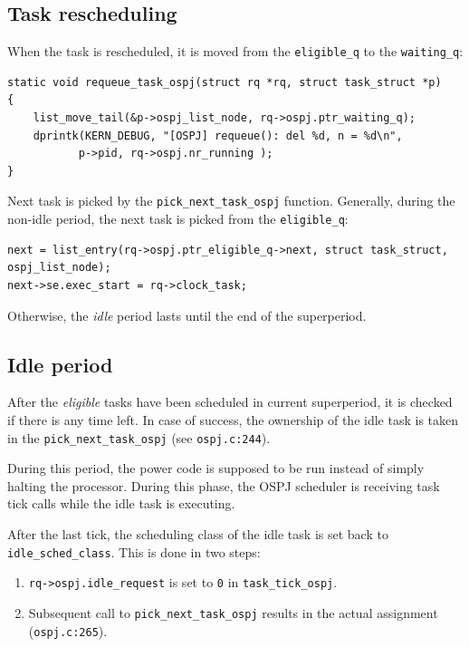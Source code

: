 \documentclass[]{report}
\begin{document}
\subsection{Task rescheduling}\label{task-rescheduling}

When the task is rescheduled, it is moved from the
\lstinline!eligible_q! to the \lstinline!waiting_q!:

\begin{lstlisting}[style=c, firstnumber=174, caption=ospj.c]
static void requeue_task_ospj(struct rq *rq, struct task_struct *p)
{
    list_move_tail(&p->ospj_list_node, rq->ospj.ptr_waiting_q);
    dprintk(KERN_DEBUG, "[OSPJ] requeue(): del %d, n = %d\n",
           p->pid, rq->ospj.nr_running );
}
\end{lstlisting}

Next task is picked by the \lstinline!pick_next_task_ospj! function.
Generally, during the non-idle period, the next task is picked from the
\lstinline!eligible_q!:

\begin{lstlisting}[style=c, firstnumber=283, caption=ospj.c]
next = list_entry(rq->ospj.ptr_eligible_q->next, struct task_struct, ospj_list_node);
next->se.exec_start = rq->clock_task;
\end{lstlisting}

Otherwise, the \emph{idle} period lasts until the end of the
superperiod.

\subsection{Idle period}\label{idle-period}

After the \emph{eligible} tasks have been scheduled in current
superperiod, it is checked if there is any time left. In case of
success, the ownership of the idle task is taken in the
\lstinline!pick_next_task_ospj! (see \lstinline!ospj.c:244!).

During this period, the power code is supposed to be run instead of
simply halting the processor. During this phase, the OSPJ scheduler is
receiving task tick calls while the idle task is executing.

After the last tick, the scheduling class of the idle task is set back
to \lstinline!idle_sched_class!. This is done in two steps:

\begin{enumerate}
\def\labelenumi{\arabic{enumi}.}
\itemsep1pt\parskip0pt
\item
  \lstinline!rq->ospj.idle_request! is set to \lstinline!0! in
  \lstinline!task_tick_ospj!.
\item
  Subsequent call to \lstinline!pick_next_task_ospj! results in the
  actual assignment (\lstinline!ospj.c:265!).
\end{enumerate}
\end{document}
